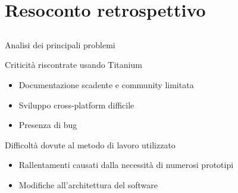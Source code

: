 \section{Resoconto retrospettivo}
	\subsection{}
		\begin{frame}{Analisi dei principali problemi}
			\begin{block}{Criticità riscontrate usando Titanium}
				\begin{itemize}
					\item Documentazione scadente e community limitata
					\item Sviluppo cross-platform difficile
					\item Presenza di bug
				\end{itemize}
			\end{block}
			\begin{block}{Difficoltà dovute al metodo di lavoro utilizzato}
				\begin{itemize}
					\item Rallentamenti causati dalla necessità di numerosi prototipi
					\item Modifiche all'architettura del software
				\end{itemize}
			\end{block}
		\end{frame}
